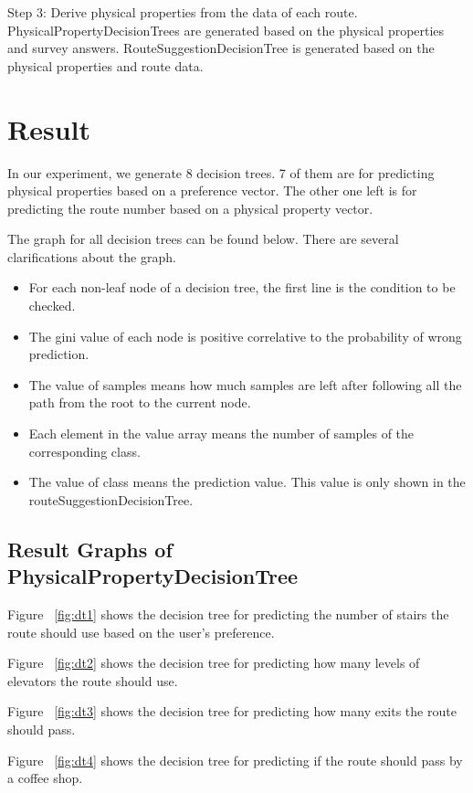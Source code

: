 \documentclass{sigchi}
\begin{document}
Step 3: Derive physical properties from the data of each route. PhysicalPropertyDecisionTrees are generated based on the physical properties and survey answers. RouteSuggestionDecisionTree is generated based on the physical properties and route data.

\section{Result}

In our experiment, we generate 8 decision trees. 7 of them are for predicting physical properties based on a preference vector. The other one left is for predicting the route number based on a physical property vector.


The graph for all decision trees can be found below. There are several clarifications about the graph.
\begin{itemize}
\item For each non-leaf node of a decision tree, the first line is the condition to be checked. 
\item The gini value of each node is positive correlative to the probability of wrong prediction. 
\item The value of samples means how much samples are left after following all the path from the root to the current node.
\item Each element in the value array means the number of samples of the corresponding class.
\item The value of class means the prediction value. This value is only shown in the routeSuggestionDecisionTree.
\end{itemize}

\subsection{Result Graphs of PhysicalPropertyDecisionTree}

Figure ~\ref{fig:dt1} shows the decision tree for predicting the number of stairs the route should use based on the user’s preference.


Figure ~\ref{fig:dt2} shows the decision tree for predicting how many levels of elevators the route should use.


Figure ~\ref{fig:dt3} shows the decision tree for predicting how many exits the route should pass.


Figure ~\ref{fig:dt4} shows the decision tree for predicting if the route should pass by a coffee shop.
\end{document}

